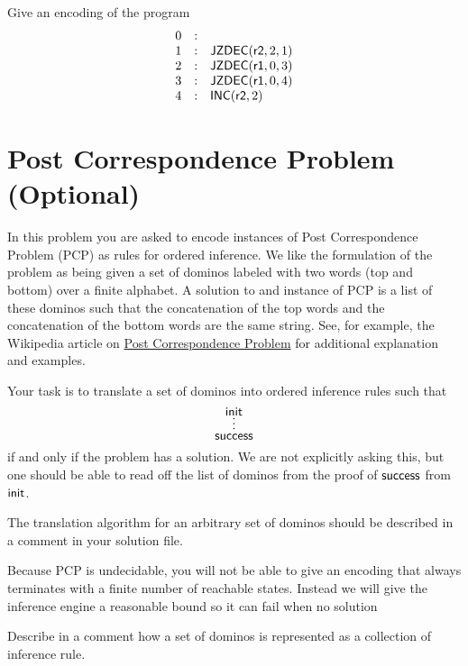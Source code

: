 \documentclass[11pt]{article}
\begin{document}
\begin{task}
  Give an encoding of the program
  \[
    \begin{array}{lcl}
      0 & : & \\
      1 & : & \mathsf{JZDEC}(\mathsf{r2}, 2, 1) \\
      2 & : & \mathsf{JZDEC}(\mathsf{r1}, 0, 3) \\
      3 & : & \mathsf{JZDEC}(\mathsf{r1}, 0, 4) \\
      4 & : & \mathsf{INC}(\mathsf{r2}, 2)
    \end{array}
  \]
\end{task}

\section{Post Correspondence Problem (Optional)}
\label{problem:pcp}

In this problem you are asked to encode instances of Post Correspondence Problem (PCP) as
rules for ordered inference.  We like the formulation of the problem as being given a set
of dominos labeled with two words (top and bottom) over a finite alphabet.  A solution to
and instance of PCP is a list of these dominos such that the concatenation of the top
words and the concatenation of the bottom words are the same string.  See, for example,
the Wikipedia article on
\href{https://en.wikipedia.org/wiki/Post_correspondence_problem}{Post Correspondence
  Problem} for additional explanation and examples.

Your task is to translate a set of dominos into ordered inference rules such that
\[
  \deduce[\ddd]{\ms{success}}{\ms{init}}
\]
if and only if the problem has a solution.  We are not explicitly asking this, but one
should be able to read off the list of dominos from the proof of $\mathsf{success}$ from
$\mathsf{init}$.

The translation algorithm for an arbitrary set of dominos should be described in a comment
in your solution file.

Because PCP is undecidable, you will not be able to give an encoding that always
terminates with a finite number of reachable states.  Instead we will give the inference
engine a reasonable bound so it can fail when no solution

\newcommand{\domino}[2]{\left[\begin{array}[c]{c}#1\\#2\end{array}\right]}

\begin{task}
  Describe in a comment how a set of dominos is represented as a collection of inference
  rule.
\end{task}
\end{document}
